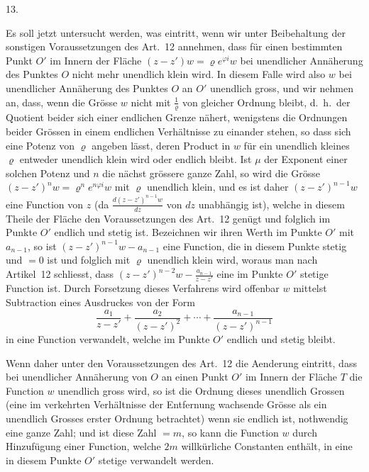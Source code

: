 \documentclass[a4paper,12pt]{article}
\begin{document}
\medbreak

\centerline{13.}

\nobreak\medskip

Es soll jetzt untersucht werden, was eintritt, wenn wir unter
Beibehaltung der sonstigen Voraussetzungen des Art.~12 annehmen,
dass f\"{u}r einen bestimmten Punkt $O'$ im Innern der Fl\"{a}che
$(z - z') w = \varrho e^{\varphi i} w$
bei unendlicher Ann\"{a}herung des Punktes $O$ nicht mehr
unendlich klein wird.  In diesem Falle wird also $w$ bei
unendlicher Ann\"{a}herung des Punktes $O$ an $O'$ unendlich
gross, und wir nehmen an, dass, wenn die Gr\"{o}sse $w$ nicht mit
$\displaystyle \frac{1}{\varrho}$
von gleicher Ordnung bleibt, d.~h.\ der Quotient beider sich
einer endlichen Grenze n\"{a}hert, wenigstens die Ordnungen
beider Gr\"{o}ssen in einem endlichen Verh\"{a}ltnisse zu
einander stehen, so dass sich eine Potenz von $\varrho$ angeben
l\"{a}sst, deren Product in $w$ f\"{u}r ein unendlich kleines
$\varrho$ entweder unendlich klein wird oder endlich bleibt.  Ist
$\mu$ der Exponent einer solchen Potenz und $n$ die n\"{a}chst
gr\"{o}ssere ganze Zahl, so wird die Gr\"{o}sse
$(z - z')^n w = \varrho^n e^{n\varphi i} w$
mit $\varrho$ unendlich klein, und es ist daher
$(z - z')^{n-1} w$ eine Function von $z$ (da
$\displaystyle \frac{d(z - z')^{n-1} w}{dz}$
von $dz$ unabh\"{a}ngig ist), welche in diesem Theile der
Fl\"{a}che den Voraussetzungen des Art.~12 gen\"{u}gt und
folglich im Punkte $O'$ endlich und stetig ist.  Bezeichnen wir
ihren Werth im Punkte $O'$ mit $a_{n-1}$, so ist
$(z - z')^{n-1} w - a_{n-1}$
eine Function, die in diesem Punkte stetig und $= 0$ ist und
folglich mit $\varrho$ unendlich klein wird, woraus man nach
Artikel~12 schliesst, dass
$\displaystyle (z - z')^{n-2} w - \frac{a_{n-1}}{z - z'}$
eine im Punkte $O'$ stetige Function ist.  Durch Forsetzung
dieses Verfahrens wird offenbar $w$ mittelst Subtraction eines
Ausdruckes von der Form
\[ \frac{a_1}{z - z'}
      + \frac{a_2}{(z - z')^2} + \cdots
      + \frac{a_{n-1}}{(z - z')^{n-1}} \]
in eine Function verwandelt, welche im Punkte $O'$ endlich und
stetig bleibt.

Wenn daher unter den Voraussetzungen des Art.~12 die Aenderung
eintritt, dass bei unendlicher Ann\"{a}herung von $O$ an einen
Punkt $O'$ im Innern der Fl\"{a}che $T$ die Function $w$
unendlich gross wird, so ist die Ordnung dieses unendlich Grossen
(eine im verkehrten Verh\"{a}ltnisse der Entfernung wachsende
Gr\"{o}sse als ein unendlich Grosses erster Ordnung betrachtet)
wenn sie endlich ist, nothwendig eine ganze Zahl; und ist diese
Zahl $= m$, so kann die Function $w$ durch Hinzuf\"{u}gung einer
Function, welche $2m$ willk\"{u}rliche Constanten enth\"{a}lt,
in eine in diesem Punkte $O'$ stetige verwandelt werden.
\end{document}
